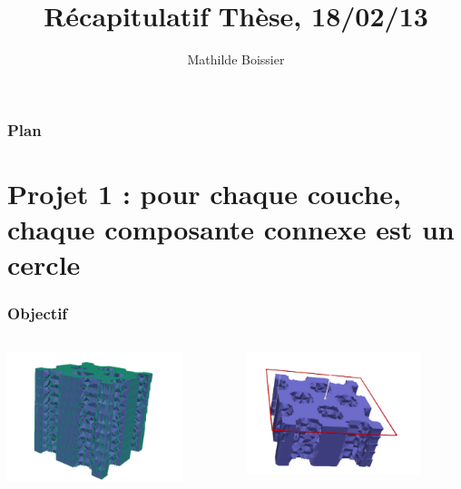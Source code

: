 \documentclass{beamer}
\begin{document}
	
	\title {Récapitulatif Thèse, 18/02/13}
	\author {Mathilde Boissier}
	\frame{\titlepage}
	
	\begin{frame}
		\frametitle{Plan}
		\tableofcontents
	\end{frame}

	\section{Projet 1 : pour chaque couche, chaque composante connexe est un cercle}
	
	
	\begin{frame}
		\frametitle{Objectif}
		
		\begin{columns}
			\begin{column}{0.45\textwidth}
				\includegraphics[width=0.8\textwidth]{Ini2}
			\end{column}
			\begin{column}{0.45\textwidth}
				\includegraphics[width=0.8\textwidth]{coupeIni2}
			\end{column}
		\end{columns}
		

\end{frame}
\end{document}
